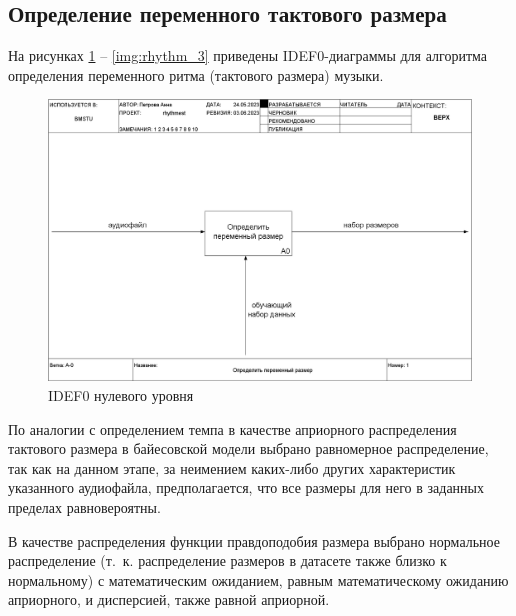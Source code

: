 \clearpage

\subsection{Определение переменного тактового размера}

На рисунках \ref{img:rhythm_0} -- \ref{img:rhythm_3} приведены IDEF0-диаграммы для алгоритма определения переменного ритма (тактового размера) музыки.

\begin{figure}[h]
	\centering
	\includegraphics[scale=0.25]{inc/img/rhythm_idef/01_A-0.png}
	\caption{IDEF0 нулевого уровня}
	\label{img:rhythm_0}
\end{figure}

По аналогии с определением темпа в качестве априорного распределения тактового размера в байесовской модели выбрано равномерное распределение, так как на данном этапе, за неимением каких-либо других характеристик указанного аудиофайла, предполагается, что все размеры для него в заданных пределах равновероятны.

В качестве распределения функции правдоподобия размера выбрано нормальное распределение (т.~к. распределение размеров в датасете также близко к нормальному) с математическим ожиданием, равным математическому ожиданию априорного, и дисперсией, также равной априорной.

